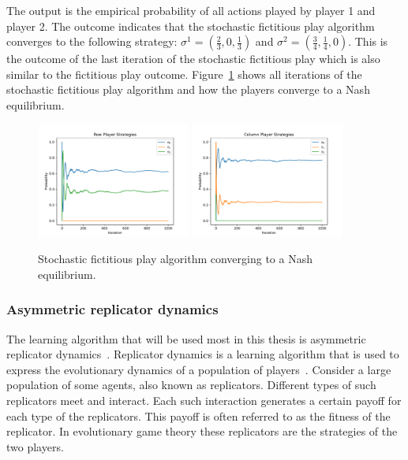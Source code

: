 The output is the empirical probability of all actions played by player 1 and
player 2.
The outcome indicates that the stochastic fictitious play algorithm converges
to the following strategy: \(\sigma^1 = (\frac{2}{3}, 0, \frac{1}{3})\) and
\(\sigma^2 = (\frac{3}{4}, \frac{1}{4}, 0)\).
This is the outcome of the last iteration of the stochastic fictitious play
which is also similar to the fictitious play outcome.
Figure~\ref{fig:stochastic_fictitious_play} shows all iterations of the
stochastic fictitious play algorithm and how the players converge to a Nash
equilibrium.

\begin{figure}[H]
    \centering
    \includegraphics[width=0.45\textwidth]{chapters/04_game_theoretic_model/img/learning_algorithms_example/stochastic_row.pdf}
    \includegraphics[width=0.45\textwidth]{chapters/04_game_theoretic_model/img/learning_algorithms_example/stochastic_col.pdf}
    \caption{Stochastic fictitious play algorithm converging to a Nash equilibrium.}
    \label{fig:stochastic_fictitious_play}
\end{figure}


\subsubsection{Asymmetric replicator dynamics}

The learning algorithm that will be used most in this thesis is asymmetric
replicator dynamics~\cite{accinelli2011evolutionarily}.
Replicator dynamics is a learning algorithm that is used to express the
evolutionary dynamics of a population of players~\cite{komarova2004replicator}.
Consider a large population of some agents, also known as replicators.
Different types of such replicators meet and interact.
Each such interaction generates a certain payoff for each type of the
replicators.
This payoff is often referred to as the fitness of the replicator.
In evolutionary game theory these replicators are the strategies of the two
players.

